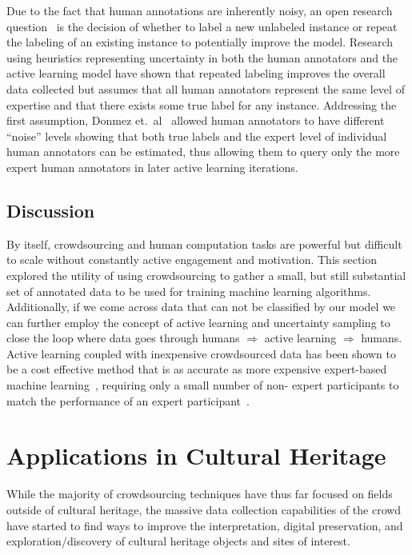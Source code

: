 \documentclass[10pt,twocolumn]{article}
\begin{document}
Due to the fact that human annotations are inherently noisy, an open 
research question~\cite{Settles2010} is the decision of whether to label a 
new unlabeled instance or repeat the labeling of an existing instance to 
potentially improve the model. Research~\cite{Sheng2008} using heuristics 
representing uncertainty in both the human annotators and the active 
learning model have shown that repeated labeling improves the overall data 
collected but assumes that all human annotators represent the same level of 
expertise and that there exists some true label for any instance. 
Addressing the first assumption, Donmez et.\ al~\cite{Donmez2009} allowed 
human annotators to have different ``noise'' levels showing that 
both true labels and the expert level of individual human annotators can be 
estimated, thus allowing them to query only the more expert human 
annotators in later active learning iterations.


\subsection{Discussion}
By itself, crowdsourcing and human computation tasks are powerful but 
difficult to scale without constantly active engagement and motivation. This
section explored the utility of using crowdsourcing to gather a small, but still
substantial set of annotated data to be used for training machine learning
algorithms. Additionally, if we come across data that can not be classified by 
our model we can further employ the concept of active learning and uncertainty
sampling to close the loop where data goes through humans $\Rightarrow$ active 
learning $\Rightarrow$ humans. Active learning coupled with inexpensive 
crowdsourced data has been shown to be a cost effective method that is as 
accurate as more expensive expert-based machine 
learning~\cite{Barrington2012,Yan2011}, requiring only a small number of non-
expert participants to match the performance of an expert 
participant~\cite{Snow2008}.


\section{Applications in Cultural Heritage}
\label{sec:applications-heritage}
While the majority of crowdsourcing techniques have thus far focused on 
fields outside of cultural heritage, the massive data collection 
capabilities of the crowd have started to find ways to improve the 
interpretation, digital preservation, and exploration/discovery of cultural 
heritage objects and sites of interest.
\end{document}
